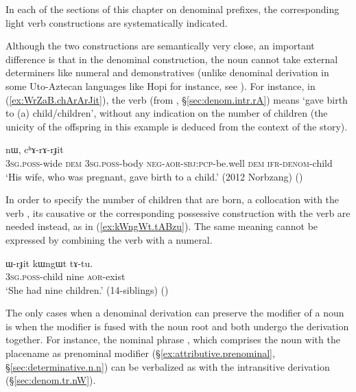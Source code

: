 In each of the sections of this chapter on denominal prefixes, the corresponding light verb constructions are systematically indicated.

Although the two constructions are semantically very close, an important difference is that in the denominal construction, the noun cannot take external determiners like numeral and demonstratives (unlike denominal derivation in some Uto-Aztecan languages like Hopi for instance, see \citealt{hill.kc03hopi}). For instance, in (\ref{ex:WrZaB.chArArJit}), the verb  (from , §\ref{sec:denom.intr.rA}) means  `gave birth to (a) child/children', without any indication on the number of children (the unicity of the offspring in this example is deduced from the context of the story).

\begin{exe}
\ex \label{ex:WrZaB.chArArJit}
 nɯ, cʰɤ-rɤ-rɟit \\
 \textsc{3sg}.\textsc{poss}-wide \textsc{dem} \textsc{3sg}.\textsc{poss}-body \textsc{neg}-\textsc{aor}-\textsc{sbj}:\textsc{pcp}-be.well \textsc{dem} \textsc{ifr}-\textsc{denom}-child \\
\glt `His wife, who was pregnant, gave birth to a child.' (2012 Norbzang)
()
\end{exe}

In order to specify the number of children that are born, a collocation with the verb , its causative  or the corresponding possessive construction with the verb  are needed instead, as in (\ref{ex:kWngWt.tABzu}). The same meaning cannot be expressed by combining the verb  with a numeral.

\begin{exe}
\ex \label{ex:kWngWt.tABzu}
\gll  ɯ-rɟit kɯngɯt tɤ-tu. \\
 \textsc{3sg}.\textsc{poss}-child nine \textsc{aor}-exist \\
\glt `She had nine children.' (14-siblings) ()
\end{exe}

The only cases when a denominal derivation can preserve the modifier of a noun is when the modifier is fused with the noun root and both undergo the derivation together. For instance, the nominal phrase , which comprises the noun  with the placename   as prenominal modifier (§\ref{ex:attributive.prenominal}, §\ref{sec:determinative.n.n}) can be verbalized as  with the intransitive  derivation (§\ref{sec:denom.tr.nW}).
 
